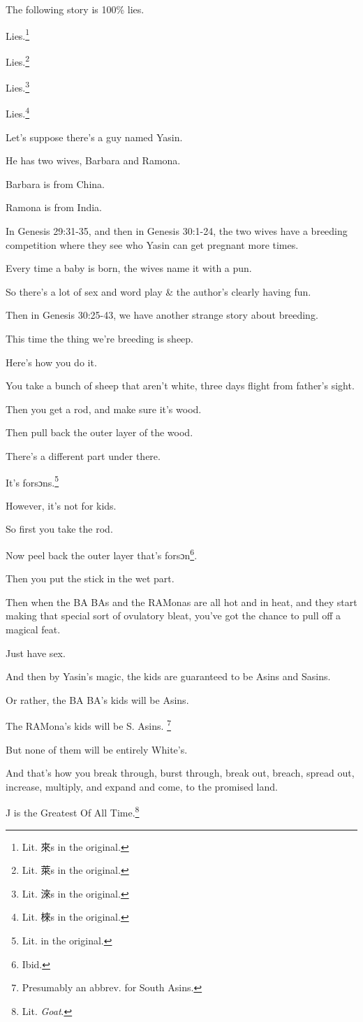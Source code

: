 {	The following story is 100\% lies.

	Lies.\footnote{Lit. 來s in the original.}

	Lies.\footnote{Lit. 萊s in the original.}

	Lies.\footnote{Lit. 淶s in the original.}

	Lies.\footnote{Lit. 棶s in the original.}

	Let's suppose there's a guy named Yasin.

	He has two wives, Barbara and Ramona.

	Barbara is from China.

	Ramona is from India.

	In Genesis 29:31-35, and then in Genesis 30:1-24,
	the two wives have a breeding competition where they see who Yasin can get pregnant more times.

	Every time a baby is born, the wives name it with a pun.

	So there's a lot of sex and word play \& the author's clearly having fun.

	Then in Genesis 30:25-43, we have another strange story about breeding.

	This time the thing we're breeding is sheep.

	Here's how you do it.

	You take a bunch of sheep that aren't white,
	three days flight from father's sight.

	Then you get a rod, and make sure it's wood.

	Then pull back the outer layer of the wood.

	There's a different part under there.

	It's forsɔns.\footnote{Lit.  in the original.}

	However, it's not for kids.

	So first you take the rod.

	Now peel back the outer layer that's forsɔn\footnote{Ibid.}.

	Then you put the stick in the wet part.

	Then when the BA BAs and the RAMonas are all hot
	and in heat, and they start making that special
	sort of ovulatory bleat, you've got the chance
	to pull off a magical feat.

	Just have sex.

	And then by Yasin's magic, the kids are guaranteed
	to be Asins and Sasins.

	Or rather, the BA BA's kids will be Asins.

	The RAMona's kids will be S. Asins.%
	\footnote{Presumably an abbrev. for South Asins.}

	But none of them will be entirely White's.

	And that's how you break through, burst through,
	break out, breach, spread out, increase, multiply,
	and expand and come, to the promised land.

	J is the Greatest Of All Time.\footnote{Lit. \textsl{Goat}.}
}
